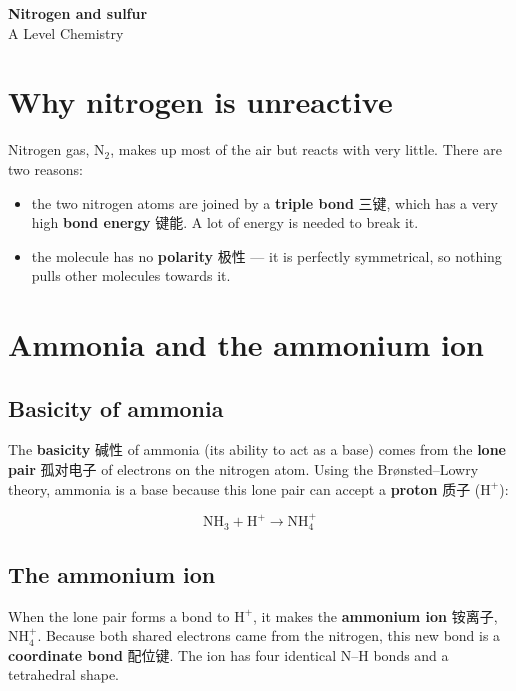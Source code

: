 \documentclass[11pt]{article}
\begin{document}
\begin{center}
  {\LARGE\bfseries Nitrogen and sulfur}\\[0.35em]
  {\large A Level Chemistry}
\end{center}
\vspace{0.6em}

\section*{Why nitrogen is unreactive}

Nitrogen gas, $\text{N}_2$, makes up most of the air but reacts with very little. There are two reasons:

\begin{itemize}
\item the two nitrogen atoms are joined by a \textbf{triple bond} 三键, which has a very high \textbf{bond energy} 键能. A lot of energy is needed to break it.

\item the molecule has no \textbf{polarity} 极性 — it is perfectly symmetrical, so nothing pulls other molecules towards it.

\end{itemize}

\section*{Ammonia and the ammonium ion}

\subsection*{Basicity of ammonia}

The \textbf{basicity} 碱性 of ammonia (its ability to act as a base) comes from the \textbf{lone pair} 孤对电子 of electrons on the nitrogen atom. Using the Brønsted–Lowry theory, ammonia is a base because this lone pair can accept a \textbf{proton} 质子 ($\text{H}^+$):

\[
\text{NH}_3 + \text{H}^+ \rightarrow \text{NH}_4^+
\]

\subsection*{The ammonium ion}

When the lone pair forms a bond to $\text{H}^+$, it makes the \textbf{ammonium ion} 铵离子, $\text{NH}_4^+$. Because both shared electrons came from the nitrogen, this new bond is a \textbf{coordinate bond} 配位键. The ion has four identical N–H bonds and a tetrahedral shape.
\end{document}
